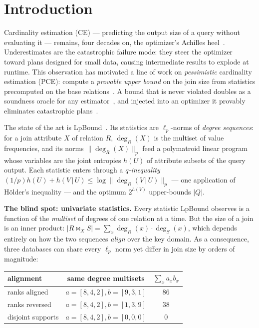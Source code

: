 \section{Introduction}
\label{sec:Introduction}



Cardinality estimation (CE) --- predicting the output size of a query
without evaluating it --- remains, four decades on, the optimizer's
Achilles heel~\cite{leis2015howgood,han2021cardinality}.
Underestimates are the catastrophic failure mode: they steer the
optimizer toward plans designed for small data, causing intermediate
results to explode at runtime.  This observation has motivated a line
of work on \emph{pessimistic} cardinality estimation (PCE): compute a
\emph{provable upper bound} on the join size from statistics
precomputed on the base relations~\cite{cai2019pessimistic,
deeds2023degree,deeds2023safebound,abokhamis2024lp,zhang2025lpbound}.
A bound that is never violated doubles as a soundness oracle for any
estimator~\cite{stoian2026outofbounds}, and injected into an
optimizer it provably eliminates catastrophic
plans~\cite{zhang2025lpbound}.

The state of the art is LpBound~\cite{zhang2025lpbound,
abokhamis2024lp}.  Its statistics are $\ell_p$-norms of
\emph{degree sequences}: for a join attribute $X$ of relation $R$,
$\deg_R(X)$ is the multiset of value frequencies, and its norms
$\|\deg_R(X)\|_p$ feed a polymatroid linear program whose variables
are the joint entropies $h(U)$ of attribute subsets of the query
output.  Each statistic enters through a \emph{$q$-inequality}
$(1/p)h(U) + h(V\,|\,U) \le \log\|\deg_R(V\,|\,U)\|_p$ --- one
application of H\"older's inequality --- and the optimum
$2^{h(V)}$ upper-bounds $|Q|$.

\vspace{1mm}
\noindent\textbf{The blind spot: univariate statistics.}
Every statistic LpBound observes is a function of the \emph{multiset}
of degrees of one relation at a time.  But the size of a join is an
inner product: $|R\Join_X S| = \sum_x \deg_R(x)\cdot\deg_S(x)$, which
depends entirely on how the two sequences \emph{align} over the key
domain.  As a consequence, three databases can share every $\ell_p$
norm yet differ in join size by orders of magnitude:

\begin{center}\small
\begin{tabular}{l|c|c}
alignment & same degree multisets & $\sum_x a_x b_x$ \\ \hline
ranks aligned & $a{=}[8,4,2], b{=}[9,3,1]$ & $86$ \\
ranks reversed & $a{=}[8,4,2], b{=}[1,3,9]$ & $38$ \\
disjoint supports & $a{=}[8,4,2], b{=}[0,0,0]$ & $0$ \\
\end{tabular}
\end{center}


